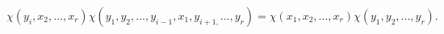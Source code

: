 \begin{equation}
\chi (y_{i},x_{2},...,x_{r})\chi
(y_{1},y_{2},...,y_{i-1},x_{1},y_{i+1,}...,y_{r})=\chi
(x_{1},x_{2},...,x_{r})\chi (y_{1},y_{2},...,y_{r}).  \label{2}
\end{equation}

